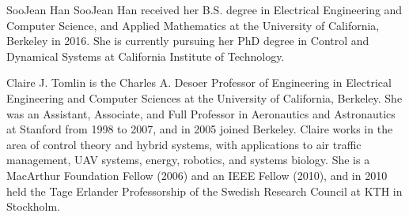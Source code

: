 \documentclass[journal]{IEEEtran}
\begin{document}
\begin{IEEEbiography}{SooJean Han}
	SooJean Han received her B.S. degree in Electrical Engineering and Computer Science, and Applied Mathematics at the University of California, Berkeley in 2016.  She is currently pursuing her PhD degree in Control and Dynamical Systems at California Institute of Technology.\vspace{-2cm}
\end{IEEEbiography}
\begin{IEEEbiography}{Claire J. Tomlin}
	is the Charles A. Desoer Professor of Engineering in Electrical Engineering and Computer Sciences at the University of California, Berkeley. She was an Assistant, Associate, and Full Professor in Aeronautics and Astronautics at Stanford from 1998 to 2007, and in 2005 joined Berkeley. Claire works in the area of control theory and hybrid systems, with applications to air traffic management, UAV systems, energy, robotics, and systems biology.  She is a MacArthur Foundation Fellow (2006) and an IEEE Fellow (2010), and in 2010 held the Tage Erlander Professorship of the Swedish Research Council at KTH in Stockholm.
\end{IEEEbiography}
\end{document}
